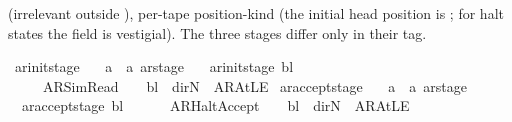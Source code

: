 \begin{isabellebody}
\begin{isamarkuptext}
   (irrelevant outside ),
  per-tape position-kind  (the initial
  head position is ; for halt states the field is
  vestigial).  The three stages differ only in their
   tag.%
\end{isamarkuptext}\isamarkuptrue%
\isamarkupfalse%
\ ar{\isacharunderscore}{\kern0pt}init{\isacharunderscore}{\kern0pt}stage\ {\isacharcolon}{\kern0pt}{\isacharcolon}{\kern0pt}\isanewline
\ \ {\isachardoublequoteopen}{\isacharprime}{\kern0pt}a\ {\isasymRightarrow}\ {\isacharprime}{\kern0pt}a\ ar{\isacharunderscore}{\kern0pt}stage{\isachardoublequoteclose}\ \isanewline
\ \ {\isachardoublequoteopen}ar{\isacharunderscore}{\kern0pt}init{\isacharunderscore}{\kern0pt}stage\ bl\ {\isacharequal}{\kern0pt}\isanewline
\ \ \ \ \ {\isacharparenleft}{\kern0pt}AR{\isacharunderscore}{\kern0pt}SimRead{\isacharcomma}{\kern0pt}\ {}{\isacharcomma}{\kern0pt}\ {}{\isacharcomma}{\kern0pt}\ {\isacharparenleft}{\kern0pt}{\isasymlambda}{\isacharunderscore}{\kern0pt}{\isachardot}{\kern0pt}\ bl{\isacharparenright}{\kern0pt}{\isacharcomma}{\kern0pt}\ {\isacharparenleft}{\kern0pt}{\isasymlambda}{\isacharunderscore}{\kern0pt}{\isachardot}{\kern0pt}\ dir{\isachardot}{\kern0pt}N{\isacharparenright}{\kern0pt}{\isacharcomma}{\kern0pt}\ {\isacharparenleft}{\kern0pt}{\isasymlambda}{\isacharunderscore}{\kern0pt}{\isachardot}{\kern0pt}\ AR{\isacharunderscore}{\kern0pt}AtLE{\isacharparenright}{\kern0pt}{\isacharparenright}{\kern0pt}{\isachardoublequoteclose}\isanewline
\isanewline
{}\isamarkupfalse%
\ ar{\isacharunderscore}{\kern0pt}accept{\isacharunderscore}{\kern0pt}stage\ {\isacharcolon}{\kern0pt}{\isacharcolon}{\kern0pt}\isanewline
\ \ {\isachardoublequoteopen}{\isacharprime}{\kern0pt}a\ {\isasymRightarrow}\ {\isacharprime}{\kern0pt}a\ ar{\isacharunderscore}{\kern0pt}stage{\isachardoublequoteclose}\ \isanewline
\ \ {\isachardoublequoteopen}ar{\isacharunderscore}{\kern0pt}accept{\isacharunderscore}{\kern0pt}stage\ bl\ {\isacharequal}{\kern0pt}\isanewline
\ \ \ \ \ {\isacharparenleft}{\kern0pt}AR{\isacharunderscore}{\kern0pt}HaltAccept{\isacharcomma}{\kern0pt}\ {}{\isacharcomma}{\kern0pt}\ {}{\isacharcomma}{\kern0pt}\ {\isacharparenleft}{\kern0pt}{\isasymlambda}{\isacharunderscore}{\kern0pt}{\isachardot}{\kern0pt}\ bl{\isacharparenright}{\kern0pt}{\isacharcomma}{\kern0pt}\ {\isacharparenleft}{\kern0pt}{\isasymlambda}{\isacharunderscore}{\kern0pt}{\isachardot}{\kern0pt}\ dir{\isachardot}{\kern0pt}N{\isacharparenright}{\kern0pt}{\isacharcomma}{\kern0pt}\ {\isacharparenleft}{\kern0pt}{\isasymlambda}{\isacharunderscore}{\kern0pt}{\isachardot}{\kern0pt}\ AR{\isacharunderscore}{\kern0pt}AtLE{\isacharparenright}{\kern0pt}{\isacharparenright}{\kern0pt}{\isachardoublequoteclose}\isanewline

\end{isabellebody}
